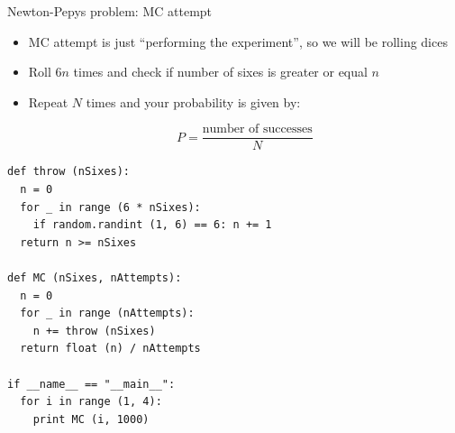 \begin{wideslide}[method=direct,toc=]{Newton-Pepys problem: MC attempt}
\null\vfill

  \begin{minipage}{0.45\textwidth}
    \begin{itemize}
     \item MC attempt is just ``performing the experiment'', so we will be rolling dices
     \item Roll $6n$ times and check if number of sixes is greater or equal $n$
     \item Repeat $N$ times and your probability is given by:
     
     $$P = \frac{\mbox{number of successes}}{N}$$
    \end{itemize}
  \end{minipage}\hspace{0.05\textwidth}\begin{minipage}{0.5\textwidth}
{\small
\begin{verbatim}
def throw (nSixes):
  n = 0
  for _ in range (6 * nSixes):
    if random.randint (1, 6) == 6: n += 1
  return n >= nSixes
  
def MC (nSixes, nAttempts):
  n = 0
  for _ in range (nAttempts):
    n += throw (nSixes)
  return float (n) / nAttempts

if __name__ == "__main__":
  for i in range (1, 4):
    print MC (i, 1000)
\end{verbatim}
}
  \end{minipage}
  
\vfill\null
\end{wideslide}

